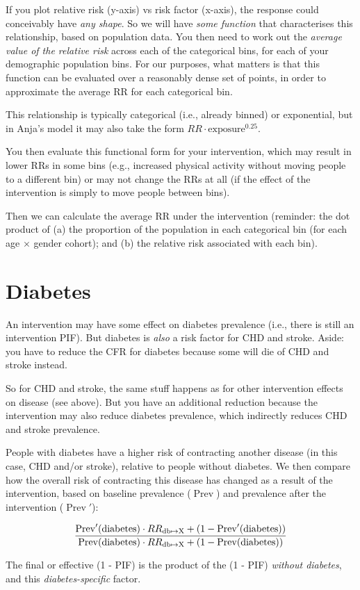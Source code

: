 \documentclass[12pt]{scrartcl}
\DeclareMathOperator{\Prev}{Prev}
\begin{document}
If you plot relative risk (y-axis) vs risk factor (x-axis), the response could conceivably have \emph{any shape}. So we will have \emph{some function} that characterises this relationship, based on population data. You then need to work out the \emph{average value of the relative risk} across each of the categorical bins, for each of your demographic population bins. For our purposes, what matters is that this function can be evaluated over a reasonably dense set of points, in order to approximate the average RR for each categorical bin.

This relationship is typically categorical (i.e., already binned) or exponential, but in Anja's model it may also take the form \(RR \cdot \mathrm{exposure}^{0.25}\).

You then evaluate this functional form for your intervention, which may result in lower RRs in some bins (e.g., increased physical activity without moving people to a different bin) or may not change the RRs at all (if the effect of the intervention is simply to move people between bins).

Then we can calculate the average RR under the intervention (reminder: the dot product of (a) the proportion of the population in each categorical bin (for each age \(\times\) gender cohort); and (b) the relative risk associated with each bin).

\section*{Diabetes}

An intervention may have some effect on diabetes prevalence (i.e., there is still an intervention PIF). But diabetes is \emph{also} a risk factor for CHD and stroke. Aside: you have to reduce the CFR for diabetes because some will die of CHD and stroke instead.

So for CHD and stroke, the same stuff happens as for other intervention effects on disease (see above). But you have an additional reduction because the intervention may also reduce diabetes prevalence, which indirectly reduces CHD and stroke prevalence.

People with diabetes have a higher risk of contracting another disease (in this case, CHD and/or stroke), relative to people without diabetes. We then compare how the overall risk of contracting this disease has changed as a result of the intervention, based on baseline prevalence (\(\Prev\)) and prevalence after the intervention (\(\Prev'\)):

\begin{equation*}
  \frac{\Prev'(\mathrm{diabetes}) \cdot RR_\mathrm{db\mapsto{}X}%
    + (1 - \Prev'(\mathrm{diabetes}))}{%
  \Prev(\mathrm{diabetes}) \cdot RR_\mathrm{db\mapsto{}X}%
    + (1 - \Prev(\mathrm{diabetes}))}
\end{equation*}

The final or effective (1 - PIF) is the product of the (1 - PIF) \emph{without diabetes}, and this \emph{diabetes-specific} factor.
\end{document}
